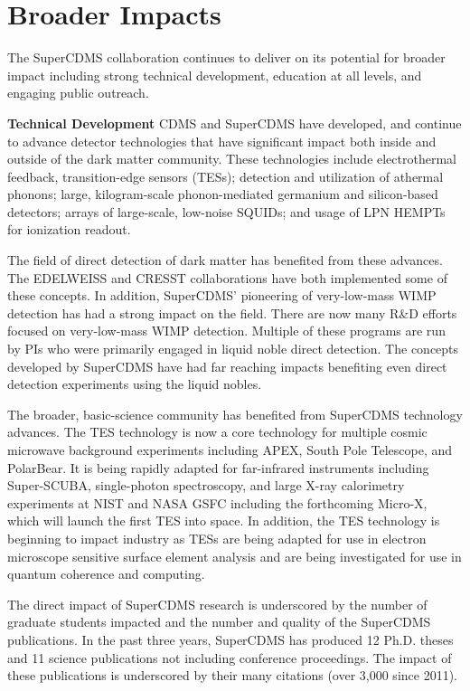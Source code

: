\section{Broader Impacts}
\label{sec:broad}

The SuperCDMS collaboration continues to deliver on its potential for broader impact including strong technical development, education at all levels, and engaging public outreach.

\textbf{Technical Development}
CDMS and SuperCDMS have developed, and continue to advance detector technologies that have significant impact both inside and outside of the dark matter community. These technologies include electrothermal feedback, transition-edge sensors (TESs); detection and utilization of athermal phonons; large, kilogram-scale phonon-mediated germanium and silicon-based detectors; arrays of large-scale, low-noise SQUIDs; and usage of LPN HEMPTs for ionization readout.

The field of direct detection of dark matter has benefited from these advances. The EDELWEISS and CRESST collaborations have both implemented some of these concepts. In addition, SuperCDMS’ pioneering of very-low-mass WIMP detection has had a strong impact on the field. There are now many R\&D efforts focused on very-low-mass WIMP detection. Multiple of these programs are run by PIs who were primarily engaged in liquid noble direct detection. The concepts developed by SuperCDMS have had far reaching impacts benefiting even direct detection experiments using the liquid nobles. 

The broader, basic-science community has benefited from SuperCDMS technology advances. The TES technology is now a core technology for multiple cosmic microwave background experiments including APEX, South Pole Telescope, and PolarBear. It is being rapidly adapted for far-infrared instruments including Super-SCUBA, single-photon spectroscopy, and large X-ray calorimetry experiments at NIST and NASA GSFC including the forthcoming Micro-X, which will launch the first TES into space. In addition, the TES technology is beginning to impact industry as TESs are being adapted for use in electron microscope sensitive surface element analysis and are being investigated for use in quantum coherence and computing.

The direct impact of SuperCDMS research is underscored by the number of graduate students impacted and the number and quality of the SuperCDMS publications. In the past three years, SuperCDMS has produced 12 Ph.D. theses and 11 science publications not including conference proceedings. The impact of these publications is underscored by their many citations (over 3,000 since 2011).

